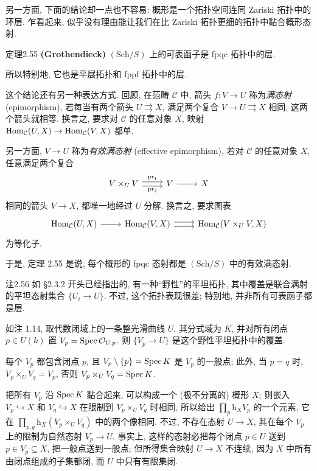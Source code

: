 另一方面, 下面的结论却一点也不容易: 概形是一个拓扑空间连同 Zariski 拓扑中的环层. 乍看起来, 似乎没有理由能让我们在比 Zariski 拓扑更细的拓扑中黏合概形态射.

\begin{origstatement}{定理}{2.55}\label{ch02:thm255}
\textbf{(Grothendieck)} $(\mathrm{Sch}/S)$ 上的可表函子是 fpqc 拓扑中的层.
\end{origstatement}

所以特别地, 它也是平展拓扑和 fppf 拓扑中的层.

这个结论还有另一种表达方式. 回顾, 在范畴 $\mathcal C$ 中, 箭头 $f:V\to U$ 称为\emph{满态射} (epimorphism), 若每当有两个箭头 $U\rightrightarrows X$, 满足两个复合 $V\to U\rightrightarrows X$ 相同, 这两个箭头就相等. 换言之, 要求对 $\mathcal C$ 的任意对象 $X$, 映射 $\operatorname{Hom}_{\mathcal C}(U,X)\to\operatorname{Hom}_{\mathcal C}(V,X)$ 都单.

另一方面, $V\to U$ 称为\emph{有效满态射} (effective epimorphism), 若对 $\mathcal C$ 的任意对象 $X$, 任意满足两个复合
\[
\begin{tikzcd}
V\times_UV\arrow[r,shift left=.6ex,"\mathrm{pr}_1"]\arrow[r,shift right=.6ex,"\mathrm{pr}_2"']&V\arrow[r]&X
\end{tikzcd}
\]
相同的箭头 $V\to X$, 都唯一地经过 $U$ 分解. 换言之, 要求图表
\[
\begin{tikzcd}
\Hom_{\mathcal C}(U,X)\arrow[r]&\Hom_{\mathcal C}(V,X)\arrow[r,shift left=.6ex]\arrow[r,shift right=.6ex]&\Hom_{\mathcal C}(V\times_UV,X)
\end{tikzcd}
\]
为等化子.

于是, 定理 2.55 是说, 每个概形的 fpqc 态射都是 $(\mathrm{Sch}/S)$ 中的有效满态射.

\begin{origstatement}{注}{2.56}\label{ch02:rem256}
如 §2.3.2 开头已经指出的, 有一种“野性”的平坦拓扑, 其中覆盖是联合满射的平坦态射集合 $\{U_i\to U\}$. 不过, 这个拓扑表现很差; 特别地, 并非所有可表函子都是层.

如注 1.14, 取代数闭域上的一条整光滑曲线 $U$, 其分式域为 $K$, 并对所有闭点 $p\in U(k)$ 置 $V_p=\operatorname{Spec}\mathcal O_{U,p}$. 则 $\{V_p\to U\}$ 是这个野性平坦拓扑中的覆盖.

每个 $V_p$ 都包含闭点 $p$, 且 $V_p\setminus\{p\}=\operatorname{Spec} K$ 是 $V_p$ 的一般点; 此外, 当 $p=q$ 时, $V_p\times_UV_q=V_p$, 否则 $V_p\times_UV_q=\operatorname{Spec} K$.

把所有 $V_p$ 沿 $\operatorname{Spec} K$ 黏合起来, 可以构成一个 (极不分离的) 概形 $X$; 则嵌入 $V_p\hookrightarrow X$ 和 $V_q\hookrightarrow X$ 在限制到 $V_p\times_UV_q$ 时相同, 所以给出 $\prod_p\mathrm h_XV_p$ 的一个元素, 它在 $\prod_{p,q}\mathrm h_X(V_p\times_UV_q)$ 中的两个像相同. 不过, 不存在态射 $U\to X$, 其在每个 $V_p$ 上的限制为自然态射 $V_p\to U$.
事实上, 这样的态射必把每个闭点 $p\in U$ 送到 $p\in V_p\subseteq X$, 把一般点送到一般点; 但所得集合映射 $U\to X$ 不连续, 因为 $X$ 中所有由闭点组成的子集都闭, 而 $U$ 中只有有限集闭.
\end{origstatement}

